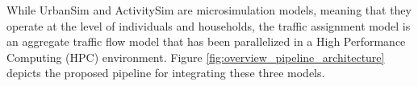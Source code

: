 While UrbanSim and ActivitySim are microsimulation models, meaning that they operate at the level of individuals and households, the traffic assignment model is an aggregate traffic flow model that has been parallelized in a High Performance Computing (HPC) environment. Figure \ref{fig:overview_pipeline_architecture} depicts the proposed pipeline for integrating these three models.
